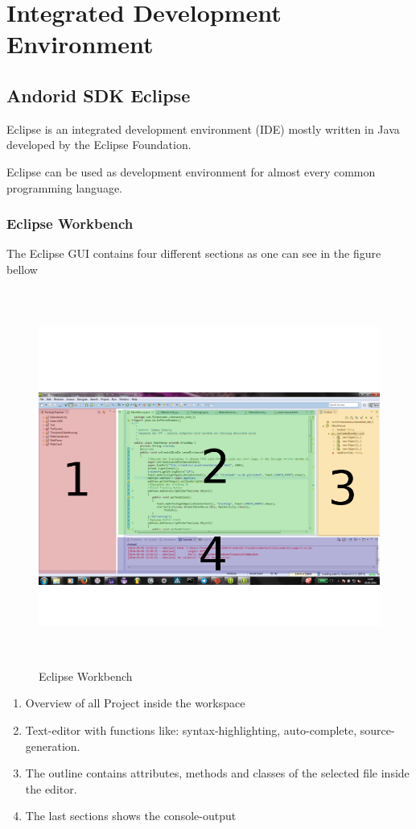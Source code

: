 \chapter{Integrated Development Environment}


\section{Andorid SDK Eclipse}

Eclipse is an integrated development environment (IDE) mostly written in Java developed by the Eclipse Foundation.

Eclipse can be used as development environment for almost every common programming language. 

\subsection{Eclipse Workbench}
The Eclipse GUI contains four different sections as one can see in the figure bellow
\\ 
\begin{figure}[h]
\centering
\includegraphics[width=400pt,height=350pt,keepaspectratio]{graphics/eclipse.png}
\caption{Eclipse Workbench}
\end{figure}

\begin{enumerate}
\item Overview of all Project inside the workspace
\item Text-editor with functions like: syntax-highlighting, auto-complete, source-generation.
\item The outline contains attributes, methods and classes of the selected file inside the editor. 
\item The last sections shows the console-output     
\end{enumerate}

